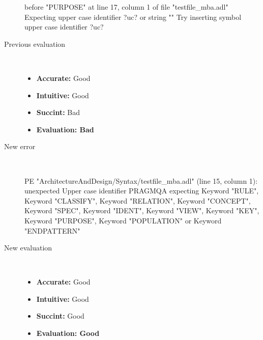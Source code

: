 \begin{description}
\begin{haskell}
before "PURPOSE" at line 17, column 1 of file "testfile_mba.adl"
Expecting upper case identifier ?uc? or string ""
Try inserting symbol upper case identifier ?uc?\end{haskell}
  \item[Previous evaluation]~\\
    \begin{itemize}
    \item \textbf{Accurate:} Good
    \item \textbf{Intuitive:} Good
    \item \textbf{Succint:} Bad
    \item \textbf{Evaluation: Bad}
    \end{itemize}
  \item[New error]~\\
\begin{haskell}
PE "ArchitectureAndDesign/Syntax/testfile_mba.adl" (line 15, column 1):
unexpected Upper case identifier PRAGMQA
expecting Keyword "RULE", Keyword "CLASSIFY", Keyword "RELATION", Keyword "CONCEPT", Keyword "SPEC", Keyword "IDENT", Keyword "VIEW", Keyword "KEY", Keyword "PURPOSE", Keyword "POPULATION" or Keyword "ENDPATTERN"\end{haskell}
  \item[New evaluation]~\\
    \begin{itemize}
    \item \textbf{Accurate:} Good
    \item \textbf{Intuitive:} Good
    \item \textbf{Succint:} Good
    \item \textbf{Evaluation: Good
}
    \end{itemize}
  \end{description}

\hrulefill

